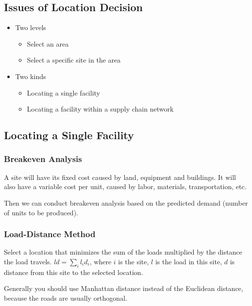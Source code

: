 \documentclass{article}
\begin{document}
\subsection{Issues of Location Decision}

\begin{itemize}
	\item Two levels
	      \begin{itemize}
		      \item Select an area
		      \item Select a specific site in the area
	      \end{itemize}
	\item Two kinds
	      \begin{itemize}
		      \item Locating a single facility
		      \item Locating a facility within a supply chain network
	      \end{itemize}
\end{itemize}



\subsection{Locating a Single Facility}

\subsubsection{Breakeven Analysis}

A site will have its fixed cost caused by land, equipment and buildings.
It will also have a variable cost per unit, caused by labor, materials, transportation, etc.

Then we can conduct breakeven analysis based on the predicted demand (number of units to be produced).

\subsubsection{Load-Distance Method}

Select a location that minimizes the sum of the loads multiplied by the distance the load travels.
$ld = \sum_i l_i d_i$, where $i$ is the site, $l$ is the load in this site,
$d$ is distance from this site to the selected location.

Generally you should use Manhattan distance instead of the Euclidean distance,
because the roads are usually orthogonal.
\end{document}
